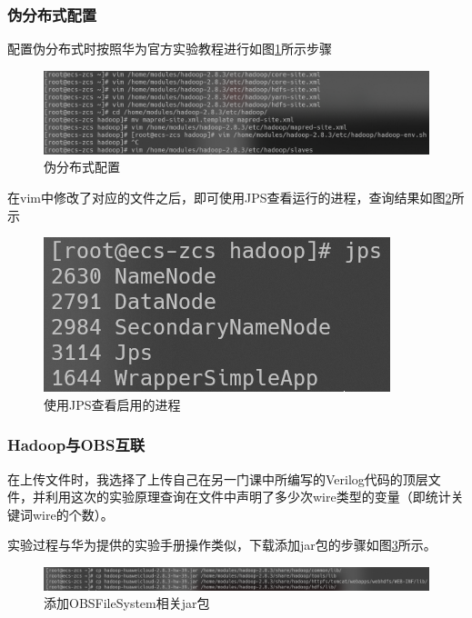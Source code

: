 \documentclass{../source/zjureport}
\begin{document}
            \subsubsection{伪分布式配置}
                配置伪分布式时按照华为官方实验教程进行如图\ref{伪分布式配置}所示步骤
                \begin{figure}[H]
                    \centering
                    \includegraphics[width = \textwidth]{figure/伪分布式配置.png}
                    \caption{伪分布式配置}
                    \label{伪分布式配置}
                \end{figure}
                在vim中修改了对应的文件之后，即可使用JPS查看运行的进程，查询结果如图\ref{JSP}所示
                \begin{figure}[H]
                    \centering
                    \includegraphics[]{figure/启动HDFS.png}
                    \caption{使用JPS查看启用的进程}
                    \label{JSP}
                \end{figure}

            \subsubsection{Hadoop与OBS互联}
                在上传文件时，我选择了上传自己在另一门课中所编写的Verilog代码的顶层文件，并利用这次的实验原理查询在文件中声明了多少次wire类型的变量（即统计关键词wire的个数）。

                实验过程与华为提供的实验手册操作类似，下载添加jar包的步骤如图\ref{添加jar}所示。
                \begin{figure}[H]
                    \centering
                    \includegraphics[width = \textwidth]{figure/添加jar包.png}
                    \caption{添加OBSFileSystem相关jar包}
                    \label{添加jar}
                \end{figure}
\end{document}
